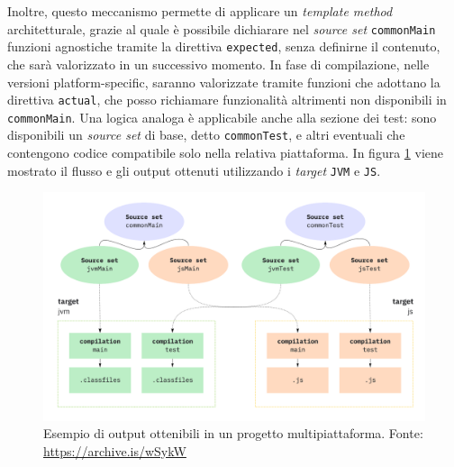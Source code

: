 \documentclass[12pt,a4paper,openright,twoside]{book}
\begin{document}
Inoltre, questo meccanismo permette di applicare un \textit{template method} architetturale, grazie al quale è possibile dichiarare nel \textit{source set} \texttt{commonMain}
funzioni agnostiche tramite la direttiva \texttt{expected}, senza definirne il contenuto, che sarà valorizzato in un successivo momento.
In fase di compilazione, nelle versioni platform-specific, saranno valorizzate tramite funzioni che adottano la direttiva \texttt{actual},
che posso richiamare funzionalità altrimenti non disponibili in \texttt{commonMain}.
Una logica analoga è applicabile anche alla sezione dei test: sono disponibili un \textit{source set} di base, detto \texttt{commonTest}, e altri
eventuali che contengono codice compatibile solo nella relativa piattaforma.
In figura \ref{fig:sourcesetscompilation} viene mostrato il flusso e gli output ottenuti utilizzando i \textit{target} \texttt{JVM} e \texttt{JS}.

\begin{figure}[H]
    \centering
     \includegraphics[width=1\linewidth]{figures/sourcesetscompilation.png}
     \caption{Esempio di output ottenibili in un progetto multipiattaforma. Fonte: \url{https://archive.is/wSykW}}
    \label{fig:sourcesetscompilation}
 \end{figure}
\end{document}
